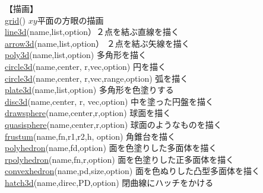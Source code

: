 \documentclass[papersize,a4paper,12pt,uplatex]{jsarticle}
\begin{document}
\begin{tabbing}
【描画】\\
\hyperlink{grid}{grid}()   \>$xy$平面の方眼の描画\\
\hyperlink{line3d}{line3d}(name,list,option）\>２点を結ぶ直線を描く\\
\hyperlink{arrow3d}{arrow3d}(name,list,option） \>２点を結ぶ矢線を描く\\
\hyperlink{poly3d}{poly3d}(name,list,option) \>多角形を描く\\\hyperlink{circle3d}{circle3d}(name,center, r,vec,option) \>円を描く\\
\hyperlink{drawarc3d}{circle3d}(name,center, r,vec,range,option) \>弧を描く\\
\hyperlink{plate3d}{plate3d}(name,list,option) \>多角形を色塗りする\\
\hyperlink{disc3d}{disc3d}(name,center, r, vec,option) \>中を塗った円盤を描く\\
\hyperlink{drawsphere}{drawsphere}(name,center,r,option) \>球面を描く\\
\hyperlink{quasisphere}{quasisphere}(name,center,r,option) \>球面のようなものを描く\\
\hyperlink{frustum}{frustum}(name,fn,r1,r2,h, option) \>角錐台を描く\\
\hyperlink{polyhedron}{polyhedron}(name,fd,option)   \>面を色塗りした多面体を描く\\
\hyperlink{rpolyhedron}{rpolyhedron}(name,fn,r,option)   \>面を色塗りした正多面体を描く\\
\hyperlink{convexhedron}{convexhedron}(name,pd,size,option) \>面を色ぬりした凸型多面体を描く\\
\hyperlink{hatch3d}{hatch3d}(name,direc,PD,option) \> 閉曲線にハッチをかける\\

\end{tabbing}
\end{document}
